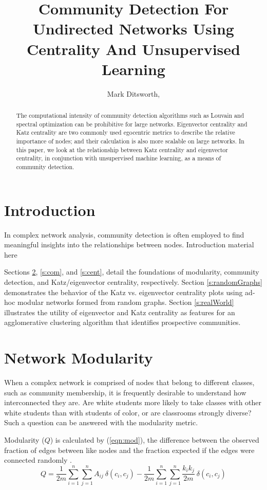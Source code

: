 \documentclass{IEEEtran}
\title{Community Detection For Undirected Networks Using Centrality And Unsupervised Learning}
\author{Mark Ditsworth, \textellipsis}
\begin{document}
	\maketitle
	\begin{abstract}
	The computational intensity of community detection algorithms such as Louvain and spectral optimization can be prohibitive for large networks.
	Eigenvector centrality and Katz centrality are two commonly used egocentric metrics to describe the relative importance of nodes; and their calculation is also more scalable on large networks.
	In this paper, we look at the relationship between Katz centrality and eigenvector centrality, in conjunction with unsupervised machine learning, as a means of community detection.
	\end{abstract}
	
	\section{Introduction}
	In complex network analysis, community detection is often employed to find meaningful insights into the relationships between nodes.
	Introduction material here \textellipsis
	
	Sections \ref{s:mod}, \ref{s:com}, and \ref{s:cent}, detail the foundations of modularity, community detection, and Katz/eigenvector centrality, respectively. Section \ref{s:randomGraphs} demonstrates the behavior of the Katz vs. eigenvector centrality plots using ad-hoc modular networks formed from random graphs. Section \ref{s:realWorld} illustrates the utility of eigenvector and Katz centrality as features for an agglomerative clustering algorithm  that identifies prospective communities.
	 
	\section{Network Modularity}
	\label{s:mod}
	When a complex network is comprised of nodes that belong to different classes, such as community membership, it is frequently desirable to understand how interconnected they are. Are white students more likely to take classes with other white students than with students of color, or are classrooms strongly diverse? Such a question can be answered with the modularity metric.
	
	Modularity ($Q$) is calculated by (\ref{eqn:mod}), the difference between the observed fraction of edges between like nodes and the fraction expected if the edges were connected randomly \cite{Mod}.
	\begin{equation}
	\label{eqn:mod}
	Q = \frac{1}{2m}\sum_{i=1}^{n}\sum_{j=1}^{n}A_{ij}~\delta(c_i,c_j) - \frac{1}{2m}\sum_{i=1}^{n}\sum_{j=1}^{n}\frac{k_ik_j}{2m}~\delta(c_i,c_j)
	\end{equation}
	
\end{document}
